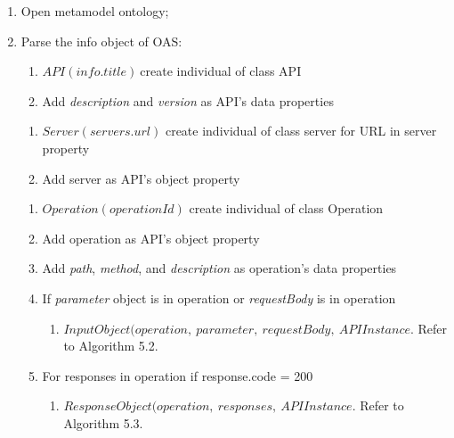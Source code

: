 \begin{algorithm}
	\DontPrintSemicolon
	\begin{enumerate}
			\item 
			Open metamodel ontology;
			\item 
			Parse the info object of OAS:
			\begin{enumerate}
			  \def\labelenumii{\alph{enumii}.}
			  \item
			    \(API(info.title)\ \)create individual of class API
			  \item
			    Add \emph{description} and \emph{version} as API's data properties
			  \end{enumerate}
			{
				\begin{enumerate}
				  \def\labelenumii{\alph{enumii}.}
				  \item
				    \(Server(servers.url)\) create individual of class server for URL in
				    server property
				  \item
				    Add server as API's object property
				  \end{enumerate}
			}\label{endfor}
			
			
			{
				{
					\begin{enumerate}
					  \def\labelenumii{\alph{enumii}.}
					  \item
					    \(Operation ( operationId)\) create individual of class Operation
					  \item
					    Add operation as API's object property
					  \item
					    Add \emph{path}, \emph{method}, and \emph{description} as
					    operation's data properties
					  \item
				    If \emph{parameter} object is in operation or \emph{requestBody} is in
					    operation
					
					    \begin{enumerate}
					    \def\labelenumiii{\roman{enumiii}.}
					    \item
					      \(InputObject(operation,\ parameter,\ requestBody,\ APIInstance \). Refer to Algorithm 5.2.
					    \end{enumerate}
					    \item 
					    For responses in operation if response.code = 200
					    \begin{enumerate}
					    	\def\labelenumiii{\roman{enumiii}.}
					    	\item
					    	\(ResponseObject( operation,\ responses,\ APIInstance \). Refer to Algorithm 5.3.
					    \end{enumerate}
					  \end{enumerate}
					  
}}
\end{enumerate}
\end{algorithm}
